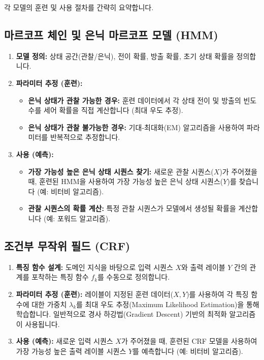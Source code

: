 \documentclass[11pt,a4paper]{article}
\theoremstyle{definition}
\begin{document}
각 모델의 훈련 및 사용 절차를 간략히 요약합니다.

\subsection{마르코프 체인 및 은닉 마르코프 모델 (HMM)}
\begin{enumerate}
    \item \textbf{모델 정의:} 상태 공간(관찰/은닉), 전이 확률, 방출 확률, 초기 상태 확률을 정의합니다.
    \item \textbf{파라미터 추정 (훈련):}
    \begin{itemize}
        \item \textbf{은닉 상태가 관찰 가능한 경우:} 훈련 데이터에서 각 상태 전이 및 방출의 빈도수를 세어 확률을 직접 계산합니다 (최대 우도 추정).
        \item \textbf{은닉 상태가 관찰 불가능한 경우:} 기대-최대화(EM) 알고리즘을 사용하여 파라미터를 반복적으로 추정합니다.
    \end{itemize}
    \item \textbf{사용 (예측):}
    \begin{itemize}
        \item \textbf{가장 가능성 높은 은닉 상태 시퀀스 찾기:} 새로운 관찰 시퀀스($X$)가 주어졌을 때, 훈련된 HMM을 사용하여 가장 가능성 높은 은닉 상태 시퀀스($Y$)를 찾습니다 (예: 비터비 알고리즘).
        \item \textbf{관찰 시퀀스의 확률 계산:} 특정 관찰 시퀀스가 모델에서 생성될 확률을 계산합니다 (예: 포워드 알고리즘).
    \end{itemize}
\end{enumerate}

\subsection{조건부 무작위 필드 (CRF)}
\begin{enumerate}
    \item \textbf{특징 함수 설계:} 도메인 지식을 바탕으로 입력 시퀀스 $X$와 출력 레이블 $Y$ 간의 관계를 포착하는 특징 함수 $f_k$를 수동으로 정의합니다.
    \item \textbf{파라미터 추정 (훈련):} 레이블이 지정된 훈련 데이터($X, Y$)를 사용하여 각 특징 함수에 대한 가중치 $\lambda_k$를 최대 우도 추정(Maximum Likelihood Estimation)을 통해 학습합니다. 일반적으로 경사 하강법(Gradient Descent) 기반의 최적화 알고리즘이 사용됩니다.
    \item \textbf{사용 (예측):} 새로운 입력 시퀀스 $X$가 주어졌을 때, 훈련된 CRF 모델을 사용하여 가장 가능성 높은 출력 레이블 시퀀스 $Y$를 예측합니다 (예: 비터비 알고리즘).
\end{enumerate}
\end{document}
